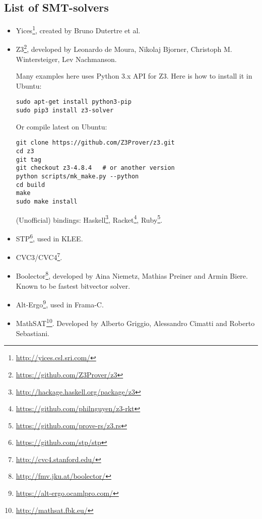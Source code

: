 \subsection{List of SMT-solvers}

\begin{itemize}

\item Yices\footnote{\url{http://yices.csl.sri.com/}}, created by Bruno Dutertre et al.

\item Z3\footnote{\url{https://github.com/Z3Prover/z3}},
developed by Leonardo de Moura, Nikolaj Bjorner, Christoph M. Wintersteiger, Lev Nachmanson.

Many examples here uses Python 3.x API for Z3.
Here is how to install it in Ubuntu:

\begin{lstlisting}
sudo apt-get install python3-pip
sudo pip3 install z3-solver
\end{lstlisting}

Or compile latest on Ubuntu:

\begin{lstlisting}
git clone https://github.com/Z3Prover/z3.git
cd z3
git tag
git checkout z3-4.8.4	# or another version
python scripts/mk_make.py --python
cd build
make
sudo make install
\end{lstlisting}

(Unofficial) bindings:
Haskell\footnote{\url{http://hackage.haskell.org/package/z3}},
Racket\footnote{\url{https://github.com/philnguyen/z3-rkt}},
Ruby\footnote{\url{https://github.com/prove-rs/z3.rs}}.

\item STP\footnote{\url{https://github.com/stp/stp}}, used in KLEE.

\item CVC3/CVC4\footnote{\url{http://cvc4.stanford.edu/}}.

\item Boolector\footnote{\url{http://fmv.jku.at/boolector/}}, developed by Aina Niemetz, Mathias Preiner and Armin Biere.
Known to be fastest bitvector solver.

\item Alt-Ergo\footnote{\url{https://alt-ergo.ocamlpro.com/}}, used in Frama-C.

\item MathSAT\footnote{\url{http://mathsat.fbk.eu/}}. Developed by Alberto Griggio, Alessandro Cimatti and Roberto Sebastiani.


\end{itemize}
